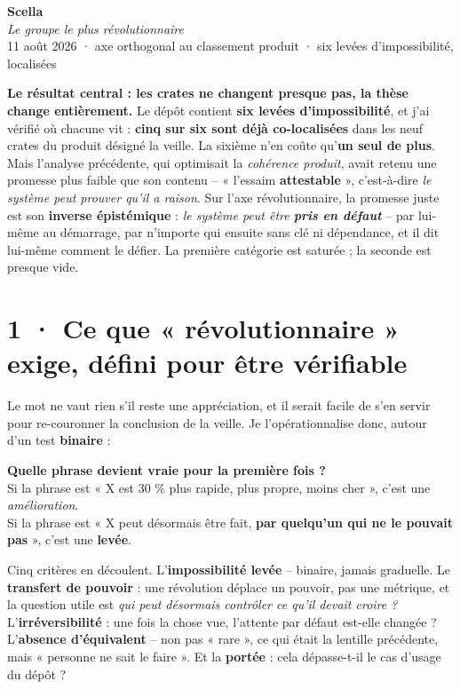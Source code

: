 \documentclass[10pt]{article}
\begin{document}
\begin{center}
{\Huge\bfseries\color{navy} Scella}\\[4pt]
{\large\color{grey}\itshape Le groupe le plus révolutionnaire}\\[4pt]
{\small\color{grey} 11 août 2026 \; · \; axe orthogonal au classement produit \; · \; six levées d'impossibilité, localisées}
\end{center}
\vspace{2pt}

\begin{these}
\textbf{Le résultat central : les crates ne changent presque pas, la thèse change entièrement.} Le
dépôt contient \textbf{six levées d'impossibilité}, et j'ai vérifié où chacune vit :
\textbf{cinq sur six sont déjà co-localisées} dans les neuf crates du produit désigné la veille. La
sixième n'en coûte qu'\textbf{un seul de plus}. Mais l'analyse précédente, qui optimisait la
\emph{cohérence produit}, avait retenu une promesse plus faible que son contenu -- « l'essaim \textbf{attestable} », c'est-à-dire
\emph{le système peut prouver qu'il a raison}. Sur l'axe révolutionnaire, la promesse juste est son
\textbf{inverse épistémique} : \emph{le système peut être \textbf{pris en défaut}} -- par lui-même au
démarrage, par n'importe qui ensuite sans clé ni dépendance, et il dit lui-même comment le défier. La
première catégorie est saturée ; la seconde est presque vide.
\end{these}

\section{1 · Ce que « révolutionnaire » exige, défini pour être vérifiable}

Le mot ne vaut rien s'il reste une appréciation, et il serait facile de s'en servir pour re-couronner
la conclusion de la veille. Je l'opérationnalise donc, autour d'un test \textbf{binaire} :

\begin{extrait}
\textbf{Quelle phrase devient vraie pour la première fois ?} \\[2pt]
Si la phrase est « X est 30 \% plus rapide, plus propre, moins cher », c'est une \emph{amélioration}. \\
Si la phrase est « X peut désormais être fait, \textbf{par quelqu'un qui ne le pouvait pas} », c'est une
\textbf{levée}.
\end{extrait}

Cinq critères en découlent. L'\textbf{impossibilité levée} -- binaire, jamais graduelle. Le
\textbf{transfert de pouvoir} : une révolution déplace un pouvoir, pas une métrique, et la question
utile est \emph{qui peut désormais contrôler ce qu'il devait croire ?} L'\textbf{irréversibilité} :
une fois la chose vue, l'attente par défaut est-elle changée ? L'\textbf{absence d'équivalent} -- non
pas « rare », ce qui était la lentille précédente, mais « personne ne sait le faire ». Et la
\textbf{portée} : cela dépasse-t-il le cas d'usage du dépôt ?
\end{document}

